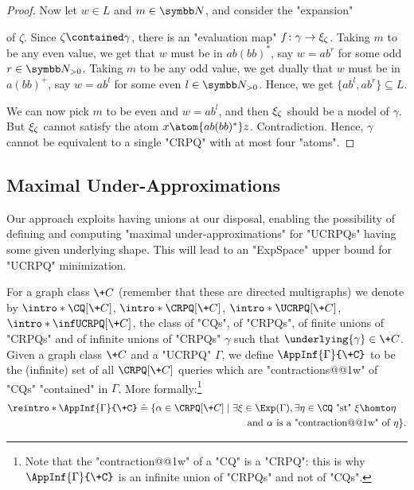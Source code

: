 \begin{proof}
	Now let $w \in L$ and $m \in \N$, and consider the "expansion"
	\begin{center}
		\small
	\end{center}
	of $\zeta$. Since $\zeta \contained \gamma$, there is
	an "evaluation map" $f\colon \gamma \to \xi_\zeta$.
	Taking $m$ to be any even value, we get that $w$ must be in $ab(bb)^*$,
	say $w = ab^r$ for some odd $r \in \Np$.
	Taking $m$ to be any odd value, we get dually that $w$ must be in $a(bb)^+$,
	say $w = ab^l$ for some even $l \in \Np$.
	Hence, we get $\{ab^l, ab^r\} \subseteq L$.

	We can now pick $m$ to be even and
	$w = ab^l$, and then $\xi_\zeta$ should be a model of $\gamma$.
	But $\xi_\zeta$ cannot satisfy the atom $x \atom{ab(bb)^*} z$.
	Contradiction. Hence, $\gamma$ cannot be equivalent to a single "CRPQ"
	with at most four "atoms".
\end{proof}

\subsection{Maximal Under-Approximations}

\AP\label{sec:maximal-under-approxiamtions}
Our approach exploits having unions at our disposal, enabling the possibility of defining and computing "maximal under-approximations" for "UCRPQs" having some given underlying shape. This will lead to an "ExpSpace" upper bound for "UCRPQ" minimization.

For a graph class $\+C$ (remember that these are directed multigraphs) we denote by \AP$\intro*\CQ[\+C]$, $\intro*\CRPQ[\+C]$, $\intro*\UCRPQ[\+C]$, $\intro*\infUCRPQ[\+C]$, the class of "CQs", of "CRPQs", of finite unions of "CRPQs" 
and of infinite unions of "CRPQs" $\gamma$ such that $\underlying{\gamma} \in \+C$.
Given a graph class $\+C$ and a "UCRPQ" $\Gamma$, we define $\AppInf{\Gamma}{\+C}$ to be the (infinite) set of all $\CRPQ[\+C]$ queries which are "contractions@@1w" of "CQs" "contained" in $\Gamma$. More formally:\footnote{Note that the "contraction@@1w" of a "CQ" is a "CRPQ": this is why $\AppInf{\Gamma}{\+C}$ is an infinite union of "CRPQs" and not of "CQs".}
\AP{}
\begin{align*}
	\reintro*\AppInf{\Gamma}{\+C} \defeq \{
		\alpha \in \CRPQ[\+C] & \mid \exists \xi \in \Exp(\Gamma), \exists \eta \in \CQ \text{ "st" }
		\xi \homto \eta \\
		& \qquad \text{ and } \alpha \text{ is a "contraction@@1w" of } \eta
	\}.
\end{align*}
	
